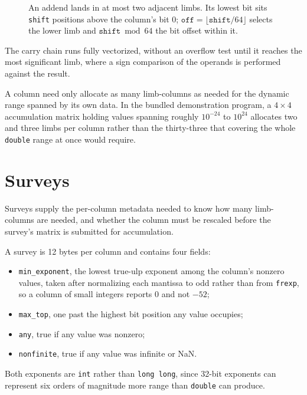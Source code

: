 \documentclass[acmsmall,screen,review]{acmart}
\newcommand{\code}[1]{\texttt{#1}}
\begin{document}
\begin{figure}[t]
\centering
{}
\caption{An addend lands in at most two adjacent limbs. Its lowest bit sits \code{shift} positions above the column's bit 0; $\code{off} = \lfloor \code{shift}/64 \rfloor$ selects the lower limb and $\code{shift} \bmod 64$ the bit offset within it.}
\label{fig:addend}
\end{figure}

The carry chain runs fully vectorized, without an overflow test until it reaches the most significant limb, where a sign comparison of the operands is performed against the result.

A column need only allocate as many limb-columns as needed for the dynamic range spanned by its own data. In the bundled demonstration program, a $4 \times 4$ accumulation matrix holding values spanning roughly $10^{-24}$ to $10^{24}$ allocates two and three limbs per column rather than the thirty-three that covering the whole \code{double} range at once would require.

\section{Surveys}

Surveys supply the per-column metadata needed to know how many limb-columns are needed, and whether the column must be rescaled before the survey's matrix is submitted for accumulation.

A survey is 12 bytes per column and contains four fields:
\begin{itemize}
\item \code{min\_exponent}, the lowest true-ulp exponent among the column's nonzero values, taken after normalizing each mantissa to odd rather than from \code{frexp}, so a column of small integers reports 0 and not $-52$;
\item \code{max\_top}, one past the highest bit position any value occupies;
\item \code{any}, true if any value was nonzero;
\item \code{nonfinite}, true if any value was infinite or NaN.
\end{itemize}
Both exponents are \code{int} rather than \code{long long}, since 32-bit exponents can represent six orders of magnitude more range than \code{double} can produce.
\end{document}

